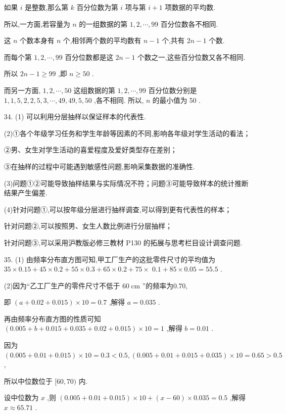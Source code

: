 如果 $i$ 是整数,那么第 $k$ 百分位数为第 $i$ 项与第 $i + 1$ 项数据的平均数.

所以,一方面,若容量为 $n$ 的一组数据的第 $1,2,\cdots ,{99}$ 百分位数各不相同.

这 $n$ 个数本身有 $n$ 个,相邻两个数的平均数有 $n - 1$ 个,共有 ${2n} - 1$ 个数.

而每个第 $1,2,\cdots ,{99}$ 百分位数都是这 ${2n} - 1$ 个数之一,这些百分位数又各不相同.

所以 ${2n} - 1 \geq  {99}$ ,即 $n \geq  {50}$ .

而另一方面, $1,2,\cdots ,{50}$ 这组数据的第 $1,2,\cdots ,{99}$ 百分位数分别是 $1,1,5,2,2,5,3,\cdots ,{49},{49},5,{50}$ ,各不相同. 所以, $n$ 的最小值为 50 .

34. (1) 可以利用分层抽样以保证样本的代表性.

(2)①各个年级学习任务和学生年龄等因素的不同,影响各年级对学生活动的看法；

②男、女生对学生活动的喜爱程度及爱好类型存在差别；

③在抽样的过程中可能遇到敏感性问题,影响采集数据的准确性.

(3)问题①②可能导致抽样结果与实际情况不符；问题③可能导致样本的统计推断结果产生偏差.

(4)针对问题①,可以按年级分层进行抽样调查,可以得到更有代表性的样本；

针对问题②,可以按照男、女生人数比例进行分层抽样；

针对问题③,可以采用沪教版必修三教材 P130 的拓展与思考栏目设计调查问题.

35. (1) 由频率分布直方图可知,甲工厂生产的这批零件尺寸的平均值为 ${35} \times  {0.15} + {45} \times  {0.2} + {55} \times  {0.3} + {65} \times  {0.2} + {75} \times$  ${0.1} + {85} \times  {0.05} = {55.5}$ .

(2)因为“乙工厂生产的零件尺寸不低于 ${60}\mathrm{\;{cm}}$ ”的频率为0.70,

即 $\left( {a + {0.02} + {0.015}}\right)  \times  {10} = {0.7}$ ,解得 $a = {0.035}$ .

再由频率分布直方图的性质可知 $\left( {{0.005} + b + {0.015} + {0.035} + {0.02} + {0.015}}\right)  \times  {10} = 1$ ,解得 $b = {0.01}$ .

因为 $\left( {{0.005} + {0.01} + {0.015}}\right)  \times  {10} = {0.3} < {0.5},\left( {{0.005} + {0.01} + {0.015} + {0.035}}\right)  \times  {10} = {0.65} > {0.5}$ ,

所以中位数位于 $\lbrack {60},{70})$ 内.

设中位数为 $x$ ,则 $\left( {{0.005} + {0.01} + {0.015}}\right)  \times  {10} + \left( {x - {60}}\right)  \times  {0.035} = {0.5}$ ,解得 $x \approx  {65.71}$ .


